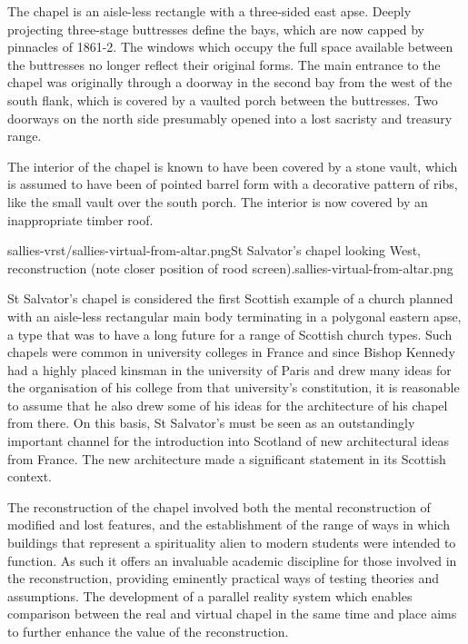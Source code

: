 The chapel is an aisle-less rectangle with a three-sided east apse. Deeply projecting three-stage buttresses define the bays, which are now capped by pinnacles of 1861-2. The windows which occupy the full space available between the buttresses no longer reflect their original forms. The main entrance to the chapel was originally through a doorway in the second bay from the west of the south flank, which is covered by a vaulted porch between the buttresses. Two doorways on the north side presumably opened into a lost sacristy and treasury range.

The interior of the chapel is known to have been covered by a stone vault, which is assumed to have been of pointed barrel form with a decorative pattern of ribs, like the small vault over the south porch. The interior is now covered by an inappropriate timber roof.

       {sallies-vrst/sallies-virtual-from-altar.png}{St Salvator's chapel looking West, reconstruction (note closer position of rood screen).}{sallies-virtual-from-altar.png}

St Salvator’s chapel is considered the first Scottish example of a church planned with an aisle-less rectangular main body terminating in a polygonal eastern apse, a type that was to have a long future for a range of Scottish church types. Such chapels were common in university colleges in France and since Bishop Kennedy had a highly placed kinsman in the university of Paris and drew many ideas for the organisation of his college from that university's constitution, it is reasonable to assume that he also drew some of his ideas for the architecture of his chapel from there. On this basis, St Salvator’s must be seen as an outstandingly important channel for the introduction into Scotland of new architectural ideas from France. The new architecture made a significant statement in its Scottish context. 

The reconstruction of the chapel involved both the mental reconstruction of modified and lost features, and the establishment of the range of ways in which buildings that represent a spirituality alien to modern students were intended to function. As such it offers an invaluable academic discipline for those involved in the reconstruction, providing eminently practical ways of testing theories and assumptions. The development of a parallel reality system which enables comparison between the real and virtual chapel in the same time and place aims to further enhance the value of the reconstruction.

